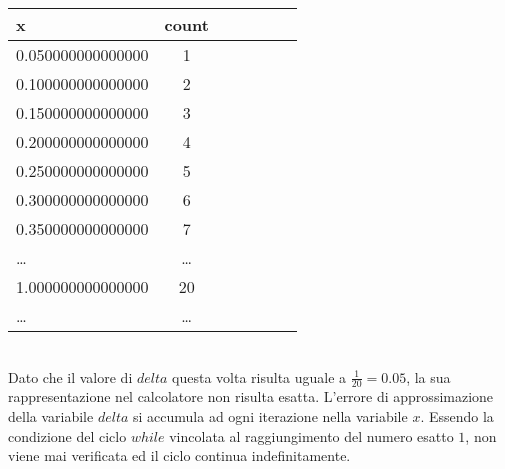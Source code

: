

\begin{tabular}{l*{6}{c}}
 x  &  count \\
\hline
 0.050000000000000 & 1 \\
 0.100000000000000 & 2 \\
 0.150000000000000 & 3 \\
 0.200000000000000 & 4 \\
 0.250000000000000 & 5 \\
 0.300000000000000 & 6 \\
 0.350000000000000 & 7 \\
 \ldots & \ldots \\
 1.000000000000000 & 20 \\
 \ldots & \ldots \\
\end{tabular} \\

Dato che il valore di \(delta\) questa volta risulta uguale a \(\frac{1}{20} = 0.05\), la sua rappresentazione nel calcolatore non risulta esatta. L'errore di approssimazione della variabile \(delta\) si accumula ad ogni iterazione nella variabile \(x\). Essendo la condizione del ciclo \(while\) vincolata al raggiungimento del numero esatto \(1\), non viene mai verificata ed il ciclo continua indefinitamente.
